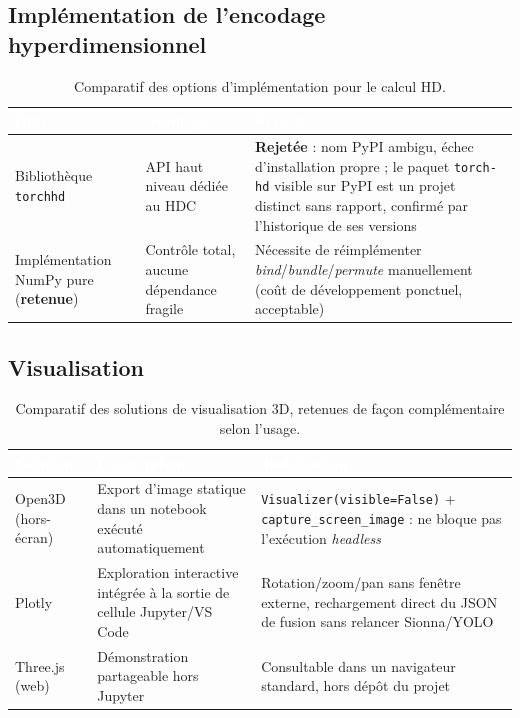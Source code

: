 \documentclass[12pt,a4paper,titlepage]{article}
\newcommand{\hd}[1]{\textcolor{white}{\textbf{#1}}}
\newcommand{\choix}{\rowcolor{tabchoice}}
\begin{document}
\subsection{Implémentation de l'encodage hyperdimensionnel}

\begin{table}[H]
    \centering
    \caption{Comparatif des options d'implémentation pour le calcul HD.}
    \begin{tabularx}{\textwidth}{F{3.4cm}LL}
        \toprule
        \hd{Option} & \hd{Avantage} & \hd{Verdict} \\
        \midrule
        Bibliothèque \texttt{torchhd} & API haut niveau dédiée au HDC & \textbf{Rejetée} : nom PyPI ambigu, échec d'installation propre ; le paquet \texttt{torch-hd} visible sur PyPI est un projet distinct sans rapport, confirmé par l'historique de ses versions \\
        \choix Implémentation NumPy pure (\textbf{retenue}) & Contrôle total, aucune dépendance fragile & Nécessite de réimplémenter \textit{bind}/\textit{bundle}/\textit{permute} manuellement (coût de développement ponctuel, acceptable) \\
        \bottomrule
    \end{tabularx}
\end{table}

\subsection{Visualisation}

\begin{table}[H]
    \centering
    \caption{Comparatif des solutions de visualisation 3D, retenues de façon complémentaire selon l'usage.}
    \begin{tabularx}{\textwidth}{F{3cm}LL}
        \toprule
        \hd{Solution} & \hd{Usage retenu} & \hd{Justification} \\
        \midrule
        Open3D~\cite{open3d} (hors-écran) & Export d'image statique dans un notebook exécuté automatiquement & \texttt{Visualizer(visible=False)} + \texttt{capture\_screen\_image} : ne bloque pas l'exécution \textit{headless} \\
        Plotly & Exploration interactive intégrée à la sortie de cellule Jupyter/VS Code & Rotation/zoom/pan sans fenêtre externe, rechargement direct du JSON de fusion sans relancer Sionna/YOLO \\
        Three.js (web) & Démonstration partageable hors Jupyter & Consultable dans un navigateur standard, hors dépôt du projet \\
        \bottomrule
    \end{tabularx}
\end{table}
\end{document}
